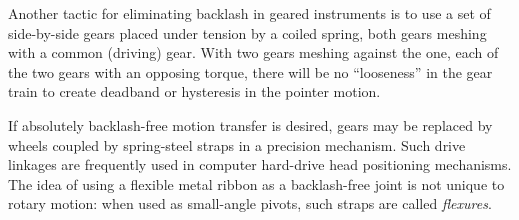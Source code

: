 





Another tactic for eliminating backlash in geared instruments is to use a set of side-by-side gears placed under tension by a coiled spring, both gears meshing with a common (driving) gear.  With two gears meshing against the one, each of the two gears with an opposing torque, there will be no ``looseness'' in the gear train to create deadband or hysteresis in the pointer motion.

If absolutely backlash-free motion transfer is desired, gears may be replaced by wheels coupled by spring-steel straps in a precision mechanism.  Such drive linkages are frequently used in computer hard-drive head positioning mechanisms.  The idea of using a flexible metal ribbon as a backlash-free joint is not unique to rotary motion: when used as small-angle pivots, such straps are called {\it flexures}.




